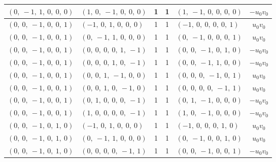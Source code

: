 \documentclass[11pt]{article}
\theoremstyle{definition}
\begin{document}
\begin{longtable}{|l|l|c|c|l|c|}
    \hline
    $\left( 0, \  -1, \  1, \  0, \  0, \  0\right)$ & $\left( 1, \  0, \  -1, \  0, \  0, \  0\right)$ & 1 & 1 & $\left( 1, \  -1, \  0, \  0, \  0, \  0\right)$ & $- u_{0} v_{0}$ \\
    \hline
    $\left( 0, \  0, \  -1, \  0, \  0, \  1\right)$ & $\left( -1, \  0, \  1, \  0, \  0, \  0\right)$ & 1 & 1 & $\left( -1, \  0, \  0, \  0, \  0, \  1\right)$ & $u_{0} v_{0}$ \\
    \hline
    $\left( 0, \  0, \  -1, \  0, \  0, \  1\right)$ & $\left( 0, \  -1, \  1, \  0, \  0, \  0\right)$ & 1 & 1 & $\left( 0, \  -1, \  0, \  0, \  0, \  1\right)$ & $u_{0} v_{0}$ \\
    \hline
    $\left( 0, \  0, \  -1, \  0, \  0, \  1\right)$ & $\left( 0, \  0, \  0, \  0, \  1, \  -1\right)$ & 1 & 1 & $\left( 0, \  0, \  -1, \  0, \  1, \  0\right)$ & $- u_{0} v_{0}$ \\
    \hline
    $\left( 0, \  0, \  -1, \  0, \  0, \  1\right)$ & $\left( 0, \  0, \  0, \  1, \  0, \  -1\right)$ & 1 & 1 & $\left( 0, \  0, \  -1, \  1, \  0, \  0\right)$ & $- u_{0} v_{0}$ \\
    \hline
    $\left( 0, \  0, \  -1, \  0, \  0, \  1\right)$ & $\left( 0, \  0, \  1, \  -1, \  0, \  0\right)$ & 1 & 1 & $\left( 0, \  0, \  0, \  -1, \  0, \  1\right)$ & $u_{0} v_{0}$ \\
    \hline
    $\left( 0, \  0, \  -1, \  0, \  0, \  1\right)$ & $\left( 0, \  0, \  1, \  0, \  -1, \  0\right)$ & 1 & 1 & $\left( 0, \  0, \  0, \  0, \  -1, \  1\right)$ & $u_{0} v_{0}$ \\
    \hline
    $\left( 0, \  0, \  -1, \  0, \  0, \  1\right)$ & $\left( 0, \  1, \  0, \  0, \  0, \  -1\right)$ & 1 & 1 & $\left( 0, \  1, \  -1, \  0, \  0, \  0\right)$ & $- u_{0} v_{0}$ \\
    \hline
    $\left( 0, \  0, \  -1, \  0, \  0, \  1\right)$ & $\left( 1, \  0, \  0, \  0, \  0, \  -1\right)$ & 1 & 1 & $\left( 1, \  0, \  -1, \  0, \  0, \  0\right)$ & $- u_{0} v_{0}$ \\
    \hline
    $\left( 0, \  0, \  -1, \  0, \  1, \  0\right)$ & $\left( -1, \  0, \  1, \  0, \  0, \  0\right)$ & 1 & 1 & $\left( -1, \  0, \  0, \  0, \  1, \  0\right)$ & $u_{0} v_{0}$ \\
    \hline
    $\left( 0, \  0, \  -1, \  0, \  1, \  0\right)$ & $\left( 0, \  -1, \  1, \  0, \  0, \  0\right)$ & 1 & 1 & $\left( 0, \  -1, \  0, \  0, \  1, \  0\right)$ & $u_{0} v_{0}$ \\
    \hline
    $\left( 0, \  0, \  -1, \  0, \  1, \  0\right)$ & $\left( 0, \  0, \  0, \  0, \  -1, \  1\right)$ & 1 & 1 & $\left( 0, \  0, \  -1, \  0, \  0, \  1\right)$ & $- u_{0} v_{0}$ \\

\end{longtable}
\end{document}

